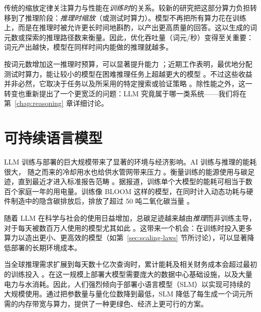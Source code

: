 
传统的缩放定律关注算力与性能在\textit{训练时}的关系。较新的研究把这部分算力负担转移到了推理阶段：\emph{推理时缩放}（或测试时算力）\citep{muennighoff2025s1}。模型不再把所有算力花在训练上，而是在推理时被允许更长时间地斟酌，以产出更高质量的回答。这以生成的词元数或探索的推理路径数来衡量。因此，优化吞吐量（词元/秒）变得至关重要：词元产出越快，模型在同样时间内能做的推理就越多。 

按词元数增加这一推理时预算，可以显著提升能力 \citep{du2024debate}；近期工作表明，最优地分配测试时算力，能让较小的模型在困难推理任务上超越更大的模型 \citep{snell2024scaling}。不过这些收益并非必然，它取决于任务以及所采用的特定搜索或验证策略 \citep{stechly2023gpt}。除性能之外，这一转变也重新提出了一个更宽泛的问题：LLM 究竟属于哪一类系统——我们将在第~\ref{chap:reasoning} 章详细讨论。


\section{可持续语言模型}
\label{sec:sustainable}
LLM 训练与部署的巨大规模带来了显著的环境与经济影响。AI 训练与推理的能耗很大，%
随之而来的冷却用水也给供水管网带来压力 \citep{10.1145/3724499, jegham2025hungryaibenchmarkingenergy}。衡量训练的能源使用与碳足迹，直到最近才进入标准报告范畴 \citep{ding2024sustainable}。据报道，训练单个大模型的能耗可相当于数百个家庭一年的用电量。训练像 BLOOM 这样的模型，在同时计入动态功耗与硬件制造中的隐含碳排放后，排放了超过 50 吨二氧化碳当量 \citep{JMLR:v24:23-0069}。

随着 LLM 在科学与社会的使用日益增加，总碳足迹越来越由\emph{推理}而非训练主导，对于每天被数百万人使用的模型尤其如此 \citep{ozcan2025quantifying, wu2022sustainable, samsi2023words}。这带来一个机会：在训练时投入更多算力以造出更小、更高效的模型（如第~\ref{sec:scaling-laws} 节所讨论），可以显著降低部署的长期环境成本。

当全球推理需求扩展到每天数十亿次查询时，累计能耗及相关财务成本会超过最初的训练投入 \citep{faiz2024llmcarbon}。在这一规模上部署大模型需要庞大的数据中心基础设施，以及大量电力与水消耗。因此，人们强烈倾向于部署小语言模型（SLM）以实现可持续的大规模使用。通过把参数量与量化位数降到最低，SLM 降低了每生成一个词元所需的内存带宽与算力，提供了一种更绿色、经济上更可行的方案。

